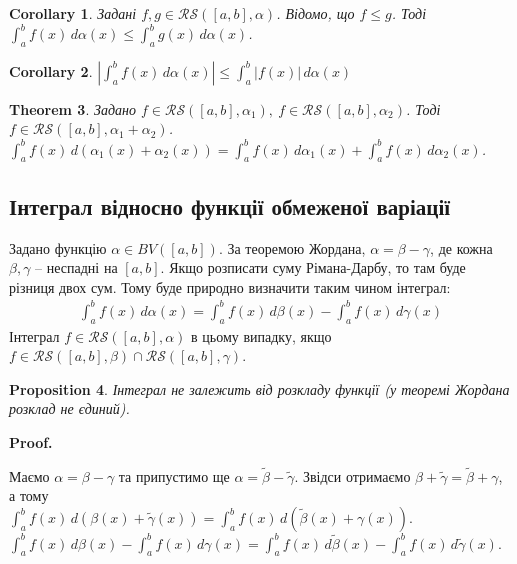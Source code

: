 \documentclass[a4paper, 10pt]{article}
\makeatletter
\theoremstyle{theoremdd}
\newtheorem{theorem}{Theorem}[subsection]
\theoremstyle{theoremdd}
\theoremstyle{theoremdd}
\theoremstyle{theoremdd}
\theoremstyle{theoremdd}
\theoremstyle{theoremdd}
\newtheorem{proposition}[theorem]{Proposition}
\theoremstyle{theoremdd}
\theoremstyle{theoremdd}
\theoremstyle{theoremdd}
\newtheorem{corollary}[theorem]{Corollary}
\renewenvironment{proof}[1][Proof.\\]{\par
\pushQED{\hfill \qed}%
\normalfont \topsep6\p@\@plus6\p@\relax
\trivlist
\item\relax
{\bfseries
#1\@addpunct{.}}\hspace\labelsep\ignorespaces
}{%
\popQED\endtrivlist\@endpefalse
}
\makeatother
\begin{document}
\begin{corollary}
Задані $f,g \in \mathcal{RS}([a,b],\alpha)$. Відомо, що $f \leq g$. Тоді $\displaystyle\int_a^b f(x)\,d\alpha(x) \leq \int_a^b g(x)\,d\alpha(x)$.
\end{corollary}

\begin{corollary}
$\displaystyle\left| \int_a^b f(x)\,d\alpha(x) \right| \leq \int_a^b |f(x)|\,d\alpha(x)$
\end{corollary}

\begin{theorem}
Задано $f \in \mathcal{RS}([a,b],\alpha_1),\ f \in \mathcal{RS}([a,b],\alpha_2)$. Тоді $f \in \mathcal{RS}([a,b],\alpha_1+\alpha_2)$.\\
$\displaystyle\int_a^b f(x)\,d(\alpha_1(x) + \alpha_2(x)) = \int_a^b f(x)\,d\alpha_1(x) + \int_a^b f(x)\,d\alpha_2(x)$.
\end{theorem}

\subsection{Інтеграл відносно функції обмеженої варіації}
Задано функцію $\alpha \in BV([a,b])$. За теоремою Жордана, $\alpha = \beta - \gamma$, де кожна $\beta,\gamma$ -- неспадні на $[a,b]$. Якщо розписати суму Рімана-Дарбу, то там буде різниця двох сум. Тому буде природно визначити таким чином інтеграл:
\begin{align*}
\int_a^b f(x)\,d\alpha(x) = \int_a^b f(x)\,d\beta(x) - \int_a^b f(x)\,d\gamma(x)
\end{align*}
\noindent
Інтеграл $f \in \mathcal{RS}([a,b],\alpha)$ в цьому випадку, якщо $f \in \mathcal{RS}([a,b],\beta) \cap \mathcal{RS}([a,b],\gamma)$.

\begin{proposition}
Інтеграл не залежить від розкладу функції (у теоремі Жордана розклад не єдиний).
\end{proposition}

\begin{proof}
Маємо $\alpha = \beta - \gamma$ та припустимо ще $\alpha = \tilde{\beta} - \tilde{\gamma}$. Звідси отримаємо $\beta + \tilde{\gamma} = \tilde{\beta} + \gamma$, а тому\\
$\displaystyle\int_a^b f(x)\,d(\beta(x) + \tilde{\gamma}(x)) = \int_a^b f(x)\,d(\tilde{\beta}(x) + \gamma(x))$.\\
$\displaystyle\int_a^b f(x)\,d\beta(x) - \int_a^b f(x)\,d\gamma(x) = \int_a^b f(x)\,d\tilde{\beta}(x) - \int_a^b f(x)\,d\tilde{\gamma}(x)$.
\end{proof}
\end{document}
